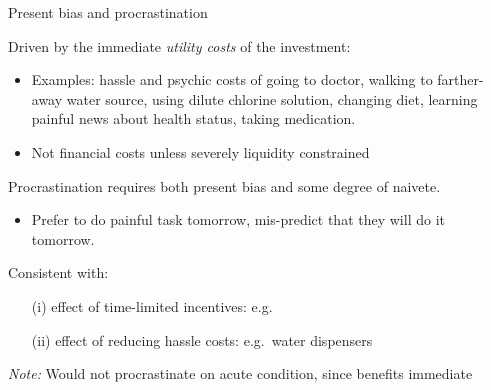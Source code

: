 \documentclass[aspectratio=169, 10pt, handout]{beamer}
\newenvironment{wideitemize}{\itemize\addtolength{\itemsep}{10pt}}{\enditemize}
\begin{document}
\begin{frame}{Present bias and procrastination}

\begin{wideitemize}

	\item Driven by the immediate \textit{utility costs} of the investment: 
	
	\begin{itemize}

	\item Examples: hassle and psychic costs of going to doctor, walking to farther-away water source, using dilute chlorine solution, changing diet, learning painful news about health status, taking medication.
	
	\item Not financial costs unless severely liquidity constrained

	\end{itemize}

	\item Procrastination requires both present bias and some degree of naivete. 
	
	\begin{itemize}
	
		\item Prefer to do painful task tomorrow, mis-predict that they will do it tomorrow.

	\end{itemize}

	\item Consistent with: 
	
	\begin{itemize}

		\item[(i)] effect of time-limited incentives: e.g.\ \cite{banerjee2010improving}
		
		\item[(ii)] effect of reducing hassle costs: e.g.\ water dispensers \citep{Ahuja2010}

	\end{itemize}

	\item \textit{Note:} Would not procrastinate on acute condition, since benefits immediate

\end{wideitemize}

\end{frame}
\end{document}
